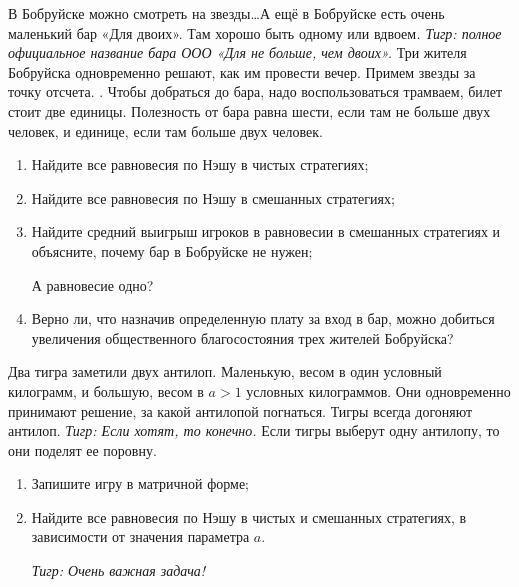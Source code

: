 \begin{problem}

В Бобруйске можно смотреть на звезды\ldots А ещё в Бобруйске есть очень маленький бар «Для двоих». Там хорошо быть одному или вдвоем{\it. Тигр: полное официальное название бара ООО «Для не больше, чем двоих».} Три жителя Бобруйска одновременно решают, как им провести вечер. Примем звезды за точку отсчета. {}. Чтобы добраться до бара, надо воспользоваться трамваем, билет стоит две единицы. Полезность от бара равна шести, если там не больше двух человек, и единице, если там больше двух человек.\par
\begin{enumerate}
\item  Найдите все равновесия по Нэшу в чистых стратегиях;\par
\item Найдите все равновесия по Нэшу в смешанных стратегиях;\par
\item  Найдите средний выигрыш игроков в равновесии в смешанных стратегиях и объясните, почему бар в Бобруйске не нужен;\par {\red А равновесие одно?}
\item Верно ли, что назначив определенную плату за вход в бар, можно добиться увеличения общественного благосостояния трех жителей Бобруйска?
\end{enumerate}


\begin{sol}

\end{sol}
\end{problem}






\begin{problem}
\begin{source}
\cite[6.2]{gintis:gte} 
\end{source}
Два тигра заметили двух антилоп. Маленькую, весом в один условный килограмм, и большую, весом в  $a>1$  условных килограммов. Они одновременно принимают решение, за какой антилопой погнаться. Тигры всегда догоняют антилоп. {\it Тигр: Если хотят, то конечно.} Если тигры выберут одну антилопу, то они поделят ее поровну.\par
\begin{enumerate}
\item Запишите игру в матричной форме;\par
\item Найдите все равновесия по Нэшу в чистых и смешанных стратегиях, в зависимости от значения параметра $a$.\par
{\it Тигр: Очень важная задача!}\par
\end{enumerate}


\begin{sol}

\end{sol}
\end{problem}

